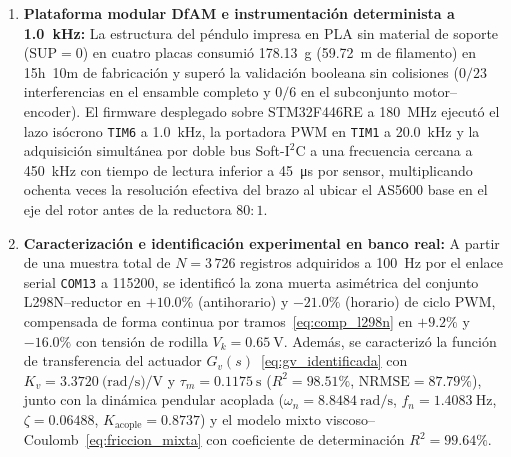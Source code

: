 \begin{enumerate}
    \item \textbf{Plataforma modular DfAM e instrumentación determinista a \qty{1.0}{\kilo\hertz}:} La estructura del péndulo impresa en PLA sin material de soporte ($\text{SUP}=0$) en cuatro placas consumió \qty{178.13}{\gram} (\qty{59.72}{\meter} de filamento) en 15h~10m de fabricación y superó la validación booleana sin colisiones ($0/23$ interferencias en el ensamble completo y $0/6$ en el subconjunto motor--encoder). El firmware desplegado sobre STM32F446RE a \qty{180}{\mega\hertz} ejecutó el lazo isócrono \texttt{TIM6} a \qty{1.0}{\kilo\hertz}, la portadora PWM en \texttt{TIM1} a \qty{20.0}{\kilo\hertz} y la adquisición simultánea por doble bus Soft-$\text{I}^2\text{C}$ a una frecuencia cercana a \qty{450}{\kilo\hertz} con tiempo de lectura inferior a \qty{45}{\micro\second} por sensor, multiplicando ochenta veces la resolución efectiva del brazo al ubicar el AS5600 base en el eje del rotor antes de la reductora $80:1$.

    \item \textbf{Caracterización e identificación experimental en banco real:} A partir de una muestra total de $N=3\,726$ registros adquiridos a \qty{100}{\hertz} por el enlace serial \texttt{COM13} a \qty{115200}{\baud}, se identificó la zona muerta asimétrica del conjunto L298N--reductor en $+10.0\%$ (antihorario) y $-21.0\%$ (horario) de ciclo PWM, compensada de forma continua por tramos~\eqref{eq:comp_l298n} en $+9.2\%$ y $-16.0\%$ con tensión de rodilla $V_k=\qty{0.65}{\volt}$. Además, se caracterizó la función de transferencia del actuador $G_v(s)$~\eqref{eq:gv_identificada} con $K_v=\qty{3.3720}{(\radian\per\second)\per\volt}$ y $\tau_m=\qty{0.1175}{\second}$ ($R^2=98.51\%$, $\mathrm{NRMSE}=87.79\%$), junto con la dinámica pendular acoplada ($\omega_n=\qty{8.8484}{\radian\per\second}$, $f_n=\qty{1.4083}{\hertz}$, $\zeta=0.06488$, $K_{\text{acople}}=0.8737$) y el modelo mixto viscoso--Coulomb~\eqref{eq:friccion_mixta} con coeficiente de determinación $R^2=99.64\%$.


\end{enumerate}
